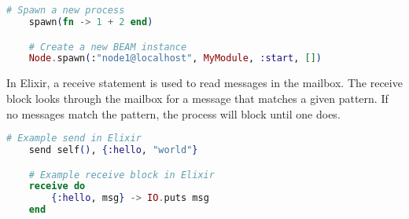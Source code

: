 \\ \\
\begin{lstlisting}[language=Elixir, xleftmargin=.2\linewidth, caption={An example of spawn/1 and spawn/4 in Elixir, for spawning a new lightweight process and a new Elixir node}]
    # Spawn a new process
    spawn(fn -> 1 + 2 end)

    # Create a new BEAM instance
    Node.spawn(:"node1@localhost", MyModule, :start, [])
\end{lstlisting}
In Elixir, a receive statement is used to read messages in the mailbox. The receive block looks through the mailbox for a message that matches a given pattern. If no messages match the pattern, the process will block until one does.
\begin{lstlisting}[language=Elixir, xleftmargin=.4\linewidth, caption={Example of sending and receiving an Elixir message}]
    # Example send in Elixir
    send self(), {:hello, "world"}

    # Example receive block in Elixir
    receive do
        {:hello, msg} -> IO.puts msg
    end
\end{lstlisting}
